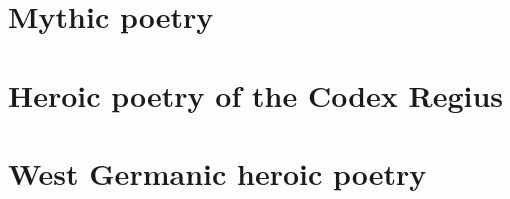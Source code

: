 
\frontmatter%

%

\mainmatter%

\part{Mythic poetry}%

\part{Heroic poetry of the Codex Regius}%
	



\part{West Germanic heroic poetry}


